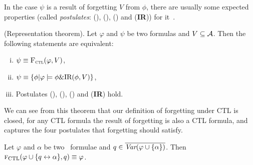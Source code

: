 \documentclass{article}
\begin{document}


In the case $\psi$ is a result of forgetting $V$ from $\phi$, there are usually some
expected properties (called {\em postulates}: (\W), (\PP), (\NgP) and (\textbf{IR})) for it~\cite{Yan:AIJ:2009}.



\begin{theorem}\label{thm:close}(Representation theorem).
Let $\varphi$ and $\psi$ be two formulas and $V \subseteq {\cal A}$.
Then the following statements are equivalent:
\begin{enumerate}[(i)]
  \item $\psi \equiv {\textsc{F}_{\textsc{ctl}}}(\varphi, V)$,
  \item $\psi \equiv \{\phi | \varphi \models \phi \& \textrm{IR}(\phi, V)\}$,
  \item Postulates (\W), (\PP), (\NgP) and (\textbf{IR}) hold.
\end{enumerate}
\end{theorem}
We can see from this theorem that our definition of forgetting under CTL is closed, \ie for any CTL formula the result of forgetting is also a CTL formula,  and captures the four postulates that forgetting should satisfy.

\begin{lemma}\label{lem:KF:eq}
	Let $\varphi$ and $\alpha$ be two \CTL\ formulae and $q\in
		\overline{\textit{Var}(\varphi\cup\{\alpha\})}$. Then
	${\textsc{f}_{\textrm{CTL}}}(\varphi \cup\{q\leftrightarrow\alpha\}, q)\equiv \varphi$.
\end{lemma}
\end{document}
